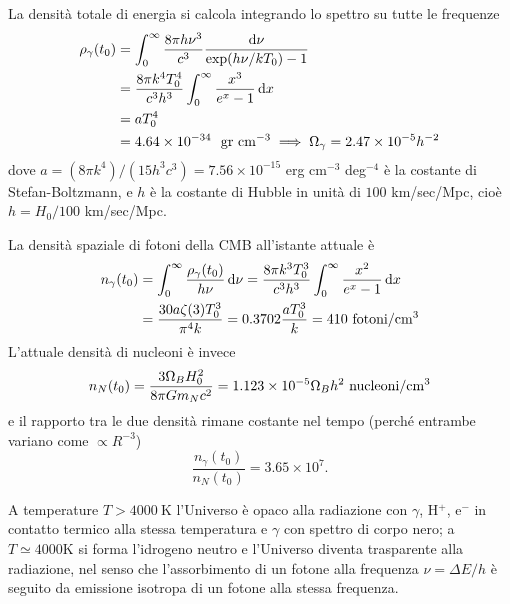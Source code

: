 La densità totale di energia si calcola integrando lo spettro su tutte le
frequenze
\begin{equation}
  \begin{split}
    \rho_{\gamma}(t_0) &= \int_0^{\infty} \frac{8 \pi h \nu^3 } {c^3}
    \frac{\mathop{}\!\mathrm{d}\nu} {\exp (h \nu/
      kT_0) -1} \\
    &= \frac{8 \pi k^4 T^4_0}{c^3 h^3} \int_0^{\infty} \frac{x^3}{e^{x} -1} \mathop{}\!\mathrm{d}
    x \\
    & = a T^4_0 \\
    & = 4.64 \times 10^{-34}~~{\rm gr~cm^{-3}} \implies \Omega_{\gamma} =2.47
    \times 10^{-5} h^{-2}
\end{split}
\end{equation}
dove $a=(8 \pi k^4)/(15 h^3 c^3) = 7.56 \times 10^{-15}$ erg cm$^{-3}$
deg$^{-4}$ è la costante di Stefan-Boltzmann, e $h$ è la costante di Hubble in
unità di $100$ km/sec/Mpc, cioè $h=H_0/100$ km/sec/Mpc.

La densità spaziale di fotoni della CMB all'istante attuale è
\begin{equation}
  \begin{split}
    n_{\gamma}(t_0) & = \int_0^{\infty} \frac{\rho_{\gamma}(t_0) } {h \nu }
    \mathop{}\!\mathrm{d}\nu
    = \frac{8 \pi k^3 T^3_0 }{c^3 h^3} \int_0^{\infty} \frac{x^2}{e^x -1} \mathop{}\!\mathrm{d} x
    \\
    & = \frac{30 a \zeta(3) T^3_0} {\pi^4 k} = 0.3702 \frac{a T^3_0}{k} = 410
    ~{\rm fotoni/cm^3}
  \end{split}
\end{equation}
L'attuale  densità di nucleoni  è invece
\begin{equation}
  n_N (t_0) = \frac{3 \Omega_B H_0^2}{8 \pi G m_N c^2} =
  1.123 \times 10^{-5} \Omega_B h^2 ~{\rm nucleoni/cm^3}
\end{equation}
e il rapporto tra le due densità rimane costante nel tempo (perché entrambe
variano come $\propto R^{-3}$)
\begin{equation}
  \frac{n_{\gamma}(t_0)}{n_N(t_0)} = 3.65 \times 10^{7}.
\end{equation}

A temperature $T>4000~$K l'Universo è opaco alla radiazione con $\gamma$, H$^+$,
e$^-$ in contatto termico alla stessa temperatura e $\gamma$ con spettro di
corpo nero; a $T \simeq 4000$K si forma l'idrogeno neutro e l'Universo diventa
trasparente alla radiazione, nel senso che l'assorbimento di un fotone alla
frequenza $\nu= \Delta E/h$ è seguito da emissione isotropa di un fotone alla
stessa frequenza.


